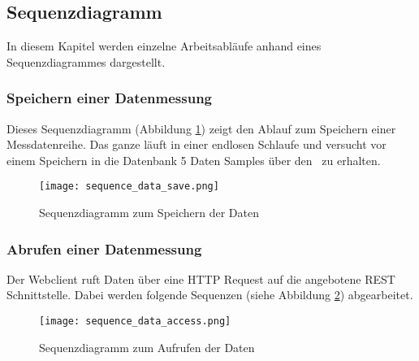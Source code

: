 \subsection{Sequenzdiagramm}
In diesem Kapitel werden einzelne Arbeitsabläufe anhand eines Sequenzdiagrammes dargestellt.
	\subsubsection{Speichern einer Datenmessung}
    Dieses Sequenzdiagramm (Abbildung \ref{fig:sequence_save}) zeigt den Ablauf zum Speichern einer Messdatenreihe. Das ganze läuft in einer endlosen Schlaufe und versucht vor einem Speichern in die Datenbank 5 Daten Samples über den \iic\ zu erhalten.
    \begin{figure}[H]
        \centering
        \texttt{[image: sequence\_data\_save.png]}
        \caption{Sequenzdiagramm zum Speichern der Daten}
        \label{fig:sequence_save}
    \end{figure}

    \clearpage
    \subsubsection{Abrufen einer Datenmessung}
    Der Webclient ruft Daten über eine HTTP Request auf die angebotene REST Schnittstelle. Dabei werden folgende Sequenzen (siehe Abbildung \ref{fig:sequence_get}) abgearbeitet.
    \begin{figure}[H]
        \centering
        \texttt{[image: sequence\_data\_access.png]}
        \caption{Sequenzdiagramm zum Aufrufen der Daten}
        \label{fig:sequence_get}
    \end{figure}